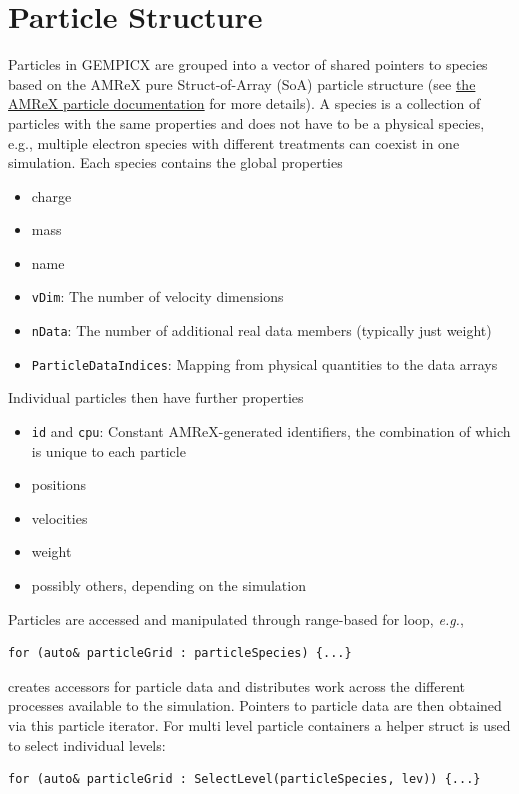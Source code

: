 \documentclass[11pt]{article}
\begin{document}
\section{Particle Structure}\label{sec:ParticleStructure}
Particles in GEMPICX are grouped into a vector of shared pointers to species based on the AMReX pure Struct-of-Array (SoA) particle structure (see \href{https://amrex-codes.github.io/amrex/docs_html/Particle.html}{the AMReX particle documentation} for more details). A species is a collection of particles with the same properties and does not have to be a physical species, e.g., multiple electron species with different treatments can coexist in one simulation.
Each species contains the global properties
\begin{itemize}
    \item charge
    \item mass
    \item name
    \item \lstinline{vDim}: The number of velocity dimensions
    \item \lstinline{nData}: The number of additional real data members (typically just weight)
    \item \lstinline{ParticleDataIndices}: Mapping from physical quantities to the data arrays
\end{itemize}
Individual particles then have further properties
\begin{itemize}
    \item \lstinline{id} and \lstinline{cpu}: Constant AMReX-generated identifiers, the combination of which is unique to each particle
    \item positions
    \item velocities
    \item weight
    \item possibly others, depending on the simulation
\end{itemize}
Particles are accessed and manipulated through range-based for loop, \emph{e.g.},
\begin{lstlisting}
for (auto& particleGrid : particleSpecies) {...}
\end{lstlisting}
creates accessors for particle data and distributes work across the different processes available to the simulation. Pointers to particle data are then obtained via this particle iterator. For multi level particle containers a helper struct is used to select individual levels:
\begin{lstlisting}
for (auto& particleGrid : SelectLevel(particleSpecies, lev)) {...}
\end{lstlisting}
\end{document}
